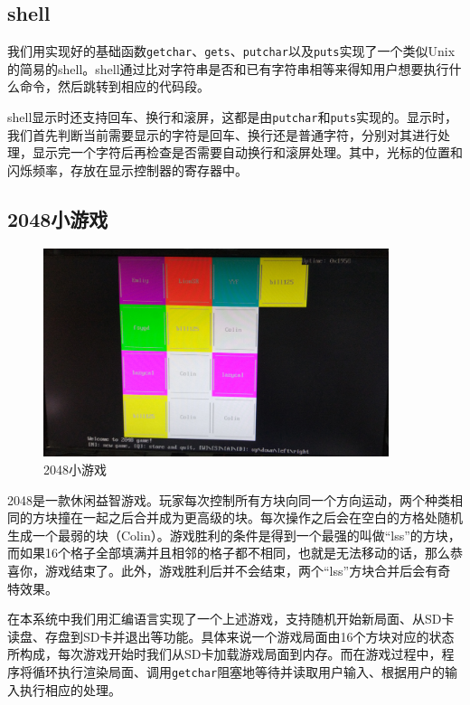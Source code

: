 \documentclass[11pt,utf8]{report}
\begin{document}
\subsection{shell}
	\par 我们用实现好的基础函数\texttt{getchar}、\texttt{gets}、\texttt{putchar}以及\texttt{puts}实现了一个类似Unix的简易的shell。shell通过比对字符串是否和已有字符串相等来得知用户想要执行什么命令，然后跳转到相应的代码段。
	\par shell显示时还支持回车、换行和滚屏，这都是由\texttt{putchar}和\texttt{puts}实现的。显示时，我们首先判断当前需要显示的字符是回车、换行还是普通字符，分别对其进行处理，显示完一个字符后再检查是否需要自动换行和滚屏处理。其中，光标的位置和闪烁频率，存放在显示控制器的寄存器中。

\subsection{2048小游戏}
	\begin{center}
	\begin{figure}[H]
			\centering
			\includegraphics[width=0.9\textwidth]{2048.jpg}
			\caption{2048小游戏}
		\end{figure}
	\end{center}

2048是一款休闲益智游戏。玩家每次控制所有方块向同一个方向运动，两个种类相同的方块撞在一起之后合并成为更高级的块。每次操作之后会在空白的方格处随机生成一个最弱的块（Colin）。游戏胜利的条件是得到一个最强的叫做“lss”的方块，而如果16个格子全部填满并且相邻的格子都不相同，也就是无法移动的话，那么恭喜你，游戏结束了。此外，游戏胜利后并不会结束，两个“lss”方块合并后会有奇特效果。

在本系统中我们用汇编语言实现了一个上述游戏，支持随机开始新局面、从SD卡读盘、存盘到SD卡并退出等功能。具体来说一个游戏局面由16个方块对应的状态所构成，每次游戏开始时我们从SD卡加载游戏局面到内存。而在游戏过程中，程序将循环执行渲染局面、调用\texttt{getchar}阻塞地等待并读取用户输入、根据用户的输入执行相应的处理。
\end{document}
